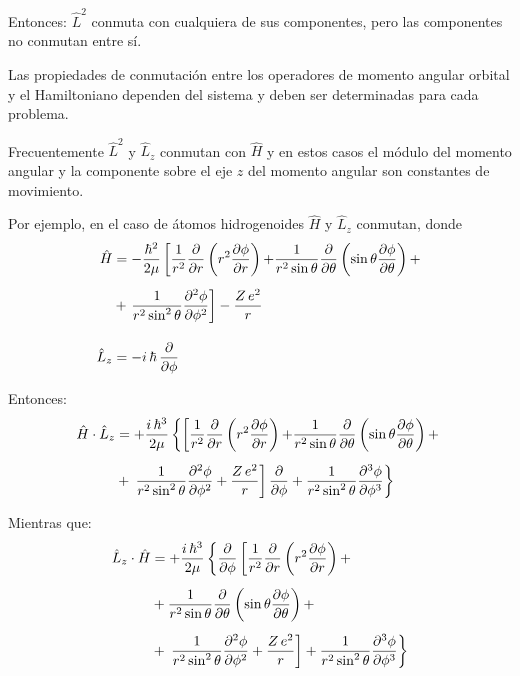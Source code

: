 Entonces: $\hat{L}^{2}$ conmuta con cualquiera de sus componentes, pero las componentes no conmutan entre sí.
\par
Las propiedades de conmutación entre los operadores de momento angular orbital y el Hamiltoniano dependen del sistema y deben ser determinadas para cada problema.
\par
Frecuentemente $\hat{L}^{2}$ y $\hat{L}_{z}$ conmutan con $\hat{H}$ y en estos casos el módulo del momento angular y la componente sobre el eje $z$ del momento angular son constantes de movimiento.
\par
Por ejemplo, en el caso de átomos hidrogenoides $\hat{H}$ y $\hat{L}_{z}$ conmutan, donde
\begin{align*}
\hat{H} &= - \dfrac{\hbar^{2}}{2 \mu} \left[ \dfrac{1}{r^{2}} \pdv{r} \left( r^{2} \pdv{\phi}{r} \right) {+} \dfrac{1}{r^{2} \sin \theta} \pdv{\theta} \left( \sin \theta \pdv{\phi}{\theta} \right) {+} \right. \\[0.5em]
&+ \left. \dfrac{1}{r^{2} \sin^{2} \theta} \pdv[2]{\phi}{\phi} \right] - \dfrac{Z \, e^{2}}{r} \\[1em]
\hat{L}_{z} &= - i \, \hbar \, \pdv{\phi}
\end{align*}

Entonces:
\begin{align*}
\hat{H} \cdot \hat{L}_{z} &= + \dfrac{i \, \hbar^{3}}{2 \mu} \left\{ \left[ \dfrac{1}{r^{2}} \pdv{r} \left( r^{2} \pdv{\phi}{r} \right) {+} \dfrac{1}{r^{2} \sin \theta} \pdv{\theta} \left( \sin \theta \pdv{\phi}{\theta} \right) {+} \right. \right. \\[0.5em]
&+ \left. \left. \dfrac{1}{r^{2} \sin^{2} \theta} \pdv[2]{\phi}{\phi} + \dfrac{Z \, e^{2}}{r} \right] \pdv{\phi} + \dfrac{1}{r^{2} \sin^{2} \theta} \pdv[3]{\phi}{\phi} \right\}
\end{align*}

Mientras que:
\begin{align*}
\hat{L}_{z} \cdot \hat{H}  &= + \dfrac{i \, \hbar^{3}}{2 \mu} \left\{ \pdv{\phi} \left[ \dfrac{1}{r^{2}} \pdv{r} \left( r^{2} \pdv{\phi}{r} \right) {+} \right. \right. \\[0.5em]
&+ \dfrac{1}{r^{2} \sin \theta} \pdv{\theta} \left( \sin \theta \pdv{\phi}{\theta} \right) {+} \\[0.5em]
&+ \left. \left. \dfrac{1}{r^{2} \sin^{2} \theta} \pdv[2]{\phi}{\phi} + \dfrac{Z \, e^{2}}{r} \right] + \dfrac{1}{r^{2} \sin^{2} \theta} \pdv[3]{\phi}{\phi} \right\}
\end{align*}

